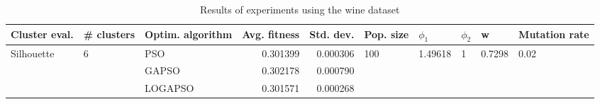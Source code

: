 \begin{table}
\centering
\caption{Results of experiments using the wine dataset}
\begin{tabular}{lllrrlllll}
\toprule
              Cluster eval. &        \# clusters & Optim. algorithm &  Avg. fitness &  Std. dev. &            Pop. size &               $\phi_{1}$ &         $\phi_{2}$ &                       w &         Mutation rate \\
\midrule
\multirow{3}{*}{Silhouette} & \multirow{3}{*}{6} &              PSO &      0.301399 &   0.000306 & \multirow{3}{*}{100} & \multirow{3}{*}{1.49618} & \multirow{3}{*}{1} & \multirow{3}{*}{0.7298} & \multirow{3}{*}{0.02} \\
                            &                    &            GAPSO &      0.302178 &   0.000790 &                      &                          &                    &                         &                       \\
                            &                    &          LOGAPSO &      0.301571 &   0.000268 &                      &                          &                    &                         &                       \\
\bottomrule
\end{tabular}
\end{table}
